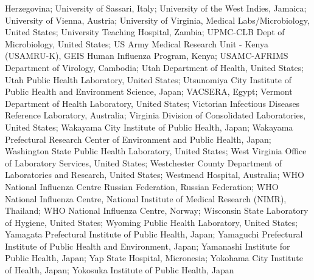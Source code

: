 \documentclass[9pt,lineno]{elife} %
\providecommand{\DIFaddbegin}{} %
\providecommand{\DIFaddbegin}{} %
\newcommand{\DIFaddincludegraphics}[2][]{{\color{blue}\fbox{\DIFOincludegraphics[#1]{#2}}}} %
\DeclareRobustCommand{\DIFaddbegin}{\DIFOaddbegin \let\includegraphics\DIFaddincludegraphics} %
\begin{document}
\begin{appendixbox}
Herzegovina; University of Sassari, Italy; University of the West Indies, Jamaica; University of Vienna, Austria; University of Virginia, Medical Labs/Microbiology, United States; University Teaching Hospital, Zambia; UPMC-CLB Dept of Microbiology, United States; US Army Medical Research Unit - Kenya (USAMRU-K), GEIS Human Influenza Program, Kenya; USAMC-AFRIMS Department of Virology, Cambodia; Utah Department of Health, United States; Utah Public Health Laboratory, United States; Utsunomiya City Institute of Public Health and Environment Science, Japan; VACSERA, Egypt; Vermont Department of Health Laboratory, United States; Victorian Infectious Diseases Reference Laboratory, Australia; Virginia Division of Consolidated Laboratories, United States; Wakayama City Institute of Public Health, Japan; Wakayama Prefectural Research Center of Environment and Public Health, Japan; Washington State Public Health Laboratory, United States; West Virginia Office of Laboratory Services, United States; Westchester County Department of Laboratories and Research, United States; Westmead Hospital, Australia; WHO National Influenza Centre Russian Federation, Russian Federation; WHO National Influenza Centre, National Institute of Medical Research (NIMR), Thailand; WHO National Influenza Centre, Norway; Wisconsin State Laboratory of Hygiene, United States; Wyoming Public Health Laboratory, United States; Yamagata Prefectural Institute of Public Health, Japan; Yamaguchi Prefectural Institute of Public Health and Environment, Japan; Yamanashi Institute for Public Health, Japan; Yap State Hospital, Micronesia; Yokohama City Institute of Health, Japan; Yokosuka Institute of Public Health, Japan
\DIFaddbegin 

\end{appendixbox}

\clearpage
\end{document}
